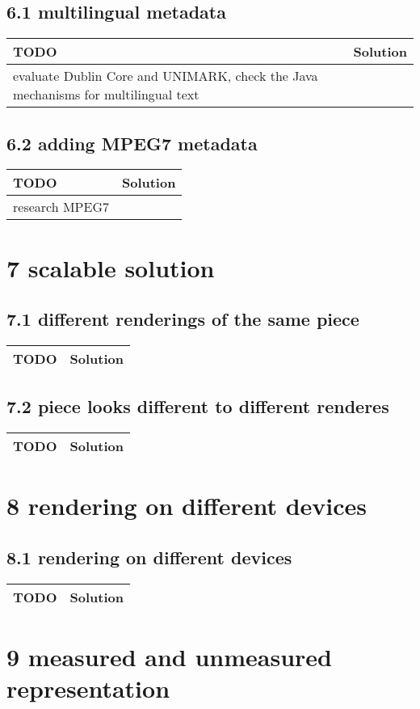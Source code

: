  \subsection*{6.1 multilingual metadata}
 \begin{tabular}{|p{}|p{}|}
 \hline
 \textbf{TODO} &
 \textbf{Solution} 
\\
 \hline
	evaluate Dublin Core and UNIMARK, check the Java mechanisms for multilingual text &
  
\\ 	\hline
 \end{tabular} \subsection*{6.2 adding MPEG7 metadata}
 \begin{tabular}{|p{}|p{}|}
 \hline
 \textbf{TODO} &
 \textbf{Solution} 
\\
 \hline
	research MPEG7 &
  
\\ 	\hline
 \end{tabular} \section*{7 scalable solution}
 \subsection*{7.1 different renderings of the same piece}
 \begin{tabular}{|p{}|p{}|}
 \hline
 \textbf{TODO} &
 \textbf{Solution} 
\\
 \hline
 \end{tabular} \subsection*{7.2 piece looks different to different renderes}
 \begin{tabular}{|p{}|p{}|}
 \hline
 \textbf{TODO} &
 \textbf{Solution} 
\\
 \hline
 \end{tabular} \section*{8 rendering on different devices}
 \subsection*{8.1 rendering on different devices}
 \begin{tabular}{|p{}|p{}|}
 \hline
 \textbf{TODO} &
 \textbf{Solution} 
\\
 \hline
 \end{tabular} \section*{9 measured and unmeasured representation}
